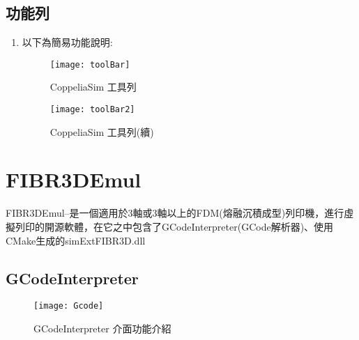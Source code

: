 \subsection{功能列}
\begin{enumerate}
\item 以下為簡易功能說明:
\begin{figure}[hbt!]
\center
\texttt{[image: toolBar]}
\caption{\Large CoppeliaSim 工具列}
\texttt{[image: toolBar2]}
\caption{\Large CoppeliaSim 工具列(續)}
\end{figure}
\begin{table}[hbt!]
\center
\large
{}
\caption{\Large 功能說明}
\end{table}
\newpage
\end{enumerate}
\section{FIBR3DEmul}
 FIBR3DEmul--是一個適用於3軸或3軸以上的FDM(熔融沉積成型)列印機，進行虛擬列印的開源軟體，在它之中包含了GCodeInterpreter(GCode解析器)、使用CMake生成的simExtFIBR3D.dll\\
\subsection{GCodeInterpreter}
\begin{figure}[hbt!]
\begin{center}
\texttt{[image: Gcode]}
\caption{\Large GCodeInterpreter 介面功能介紹}\label{GCode}
\end{center}
\end{figure}
\newpage


